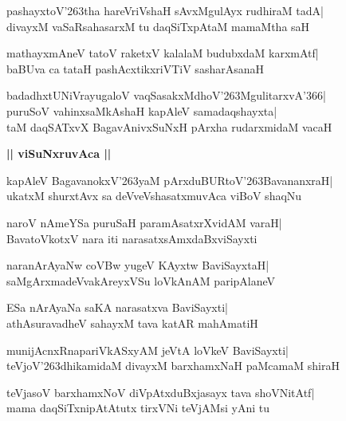 \documentclass[twoside,12pt,openright]{book}
\def\S{\char'263}
\newcounter{shloka}[chapter]
\def\uvaca#1{\centerline{{\large\textbf{#1}}}}
\begin{document}
\begin{shloka}%
pashayxtoV\S tha hareVriVshaH sAvxMgulAyx rudhiraM tadA|\\
divayxM vaSaRsahasarxM tu daqSiTxpAtaM mamaMtha saH
\end{shloka}

\begin{shloka}%
mathayxmAneV tatoV raketxV kalalaM budubxdaM karxmAtf|\\
baBUva ca tataH pashAcxtikxriVTiV sasharAsanaH
\end{shloka}

\begin{shloka}%
badadhxtUNiVrayugaloV vaqSasakxMdhoV\S MgulitarxvA\char'366|\\
puruSoV vahinxsaMkAshaH kapAleV samadaqshayxta|\\
taM daqSATxvX BagavAnivxSuNxH pArxha rudarxmidaM vacaH
\end{shloka}

\uvaca{|| viSuNxruvAca ||}
\begin{shloka}%
kapAleV BagavanokxV\S yaM pArxduBURtoV\S BavananxraH|\\
ukatxM shurxtAvx sa deVveVshasatxmuvAca viBoV shaqNu
\end{shloka}

\begin{shloka}%
naroV nAmeYSa puruSaH paramAsatxrXvidAM varaH|\\
BavatoVkotxV nara iti narasatxsAmxdaBxviSayxti
\end{shloka}

\begin{shloka}%
naranArAyaNw coVBw yugeV KAyxtw BaviSayxtaH|\\
saMgArxmadeVvakAreyxVSu loVkAnAM paripAlaneV
\end{shloka}

\begin{shloka}%
ESa nArAyaNa saKA narasatxva BaviSayxti|\\
athAsuravadheV sahayxM tava katAR mahAmatiH
\end{shloka}

\begin{shloka}%
munijAcnxRnapariVkASxyAM jeVtA loVkeV BaviSayxti|\\
teVjoV\S dhikamidaM divayxM barxhamxNaH paMcamaM shiraH
\end{shloka}

\begin{shloka}%
teVjasoV barxhamxNoV diVpAtxduBxjasayx tava shoVNitAtf|\\
mama daqSiTxnipAtAtutx tirxVNi teVjAMsi yAni tu
\end{shloka}
\end{document}
